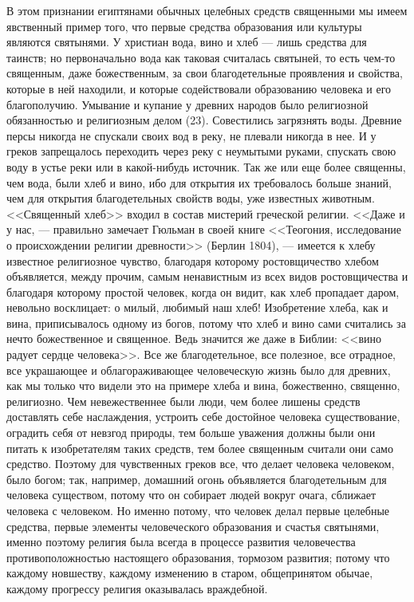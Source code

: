 \documentclass[12pt]{article}
\begin{document}
В этом признании египтянами обычных целебных средств священными мы имеем явственный пример того, что первые средства образования или культуры являются святынями. У христиан вода, вино и хлеб --- лишь средства для таинств; но первоначально вода как таковая считалась святыней, то есть чем-то священным, даже божественным, за свои благодетельные проявления и свойства, которые в ней находили, и которые содействовали образованию человека и его благополучию. Умывание и купание у древних народов было религиозной обязанностью и религиозным делом (23). Совестились загрязнять воды. Древние персы никогда не спускали своих вод в реку, не плевали никогда в нее. И у греков запрещалось переходить через реку с неумытыми руками, спускать свою воду в устье реки или в какой-нибудь источник. Так же или еще более священны, чем вода, были хлеб и вино, ибо для открытия их требовалось больше знаний, чем для открытия благодетельных свойств воды, уже известных животным. <<Священный хлеб>> входил в состав мистерий греческой религии. <<Даже и у нас, --- правильно замечает Гюльман в своей книге <<Теогония, исследование о происхождении религии древности>> (Берлин 1804), --- имеется к хлебу известное религиозное чувство, благодаря которому ростовщичество хлебом объявляется, между прочим, самым ненавистным из всех видов ростовщичества и благодаря которому простой человек, когда он видит, как хлеб пропадает даром, невольно восклицает: о милый, любимый наш хлеб! Изобретение хлеба, как и вина, приписывалось одному из богов, потому что хлеб и вино сами считались за нечто божественное и священное. Ведь значится же даже в Библии: <<вино радует сердце человека>>. Все же благодетельное, все полезное, все отрадное, все украшающее и облагораживающее человеческую жизнь было для древних, как мы только что видели это на примере хлеба и вина, божественно, священно, религиозно. Чем невежественнее были люди, чем более лишены средств доставлять себе наслаждения, устроить себе достойное человека существование, оградить себя от невзгод природы, тем больше уважения должны были они питать к изобретателям таких средств, тем более священным считали они само средство. Поэтому для чувственных греков все, что делает человека человеком, было богом; так, например, домашний огонь объявляется благодетельным для человека существом, потому что он собирает людей вокруг очага, сближает человека с человеком. Но именно потому, что человек делал первые целебные средства, первые элементы человеческого образования и счастья святынями, именно поэтому религия была всегда в процессе развития человечества противоположностью настоящего образования, тормозом развития; потому что каждому новшеству, каждому изменению в старом, общепринятом обычае, каждому прогрессу религия оказывалась враждебной. 
\end{document}
